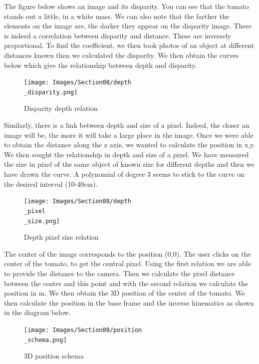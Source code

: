 The figure below shows an image and its disparity. You can see that the tomato stands out a little, in a white mass. We can also note that the farther the elements on the image are, the darker they appear on the disparity image. There is indeed a correlation between disparity and distance. These are inversely proportional. To find the coefficient, we then took photos of an object at different distances known then we calculated the disparity. We then obtain the curves below which give the relationship between depth and disparity.
\begin{figure}[H]
    \centering
    \texttt{[image: Images/Section08/depth\\\_disparity.png]}
    \caption{Disparity depth relation}
    \label{fig:DisparityDepth}
\end{figure}
\FloatBarrier

Similarly, there is a link between depth and size of a pixel. Indeed, the closer an image will be, the more it will take a large place in the image. Once we were able to obtain the distance along the z axis, we wanted to calculate the position in x,y. We then sought the relationship in depth and size of a pixel. We have measured the size in pixel of the same object of known size for different depths and then we have drawn the curve. A polynomial of degree 3 seems to stick to the curve on the desired interval (10-40cm).
\begin{figure}[H]
    \centering
    \texttt{[image: Images/Section08/depth\\\_pixel\\\_size.png]}
    \caption{Depth pixel size relation}
    \label{fig:DepthPixel}
\end{figure}
\FloatBarrier

The center of the image corresponds to the position (0,0). The user clicks on the center of the tomato, to get the central pixel. Using the first relation we are able to provide the distance to the camera. Then we calculate the pixel distance between the center and this point and with the second relation we calculate the position in m. We then obtain the 3D position of the center of the tomato.  We then calculate the position in the base frame and the inverse kinematics as shown in the diagram below.
\begin{figure}[H]
    \centering
    \texttt{[image: Images/Section08/position\\\_schema.png]}
    \caption{3D position schema}
    \label{fig:PositionSchema}
\end{figure}
\FloatBarrier

